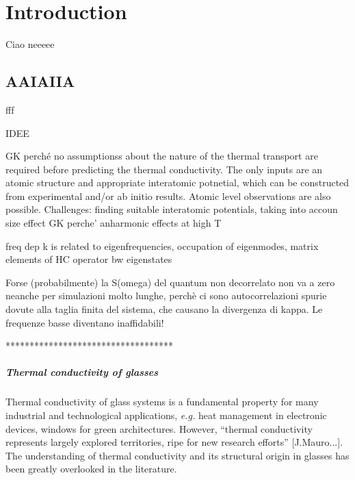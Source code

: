 \chapter{Introduction}

Ciao neeeee

\section{AAIAIIA}

fff


IDEE

GK perché no assumptionss about the nature of the thermal transport are required before predicting the thermal conductivity. The only inputs are an atomic structure and appropriate interatomic potnetial, which can be constructed from experimental and/or ab initio results. Atomic level observations are also possible. 
Challenges: finding suitable interatomic potentials, taking into accoun size effect
GK perche' anharmonic effects at high T

freq dep k is related to eigenfrequencies, occupation of eigenmodes, matrix elements of HC operator  bw eigenstates

Forse (probabilmente) la S(omega) del quantum non decorrelato non va a zero neanche per simulazioni molto lunghe, perchè ci sono autocorrelazioni spurie dovute alla taglia finita del sistema, che causano la divergenza di kappa.
Le frequenze basse diventano inaffidabili!


***********************************

\paragraph{Thermal conductivity of glasses}
Thermal conductivity of glass systems is a fundamental property for many industrial and technological applications, \emph{e.g.} heat management in electronic devices, windows for green architectures.
However, ``thermal conductivity represents largely explored territories, ripe for new research efforts'' [J.Mauro...]\cite{MauroFM14,Mauro2014}. The understanding of thermal conductivity and its structural origin in glasses has been greatly overlooked in the literature. 

